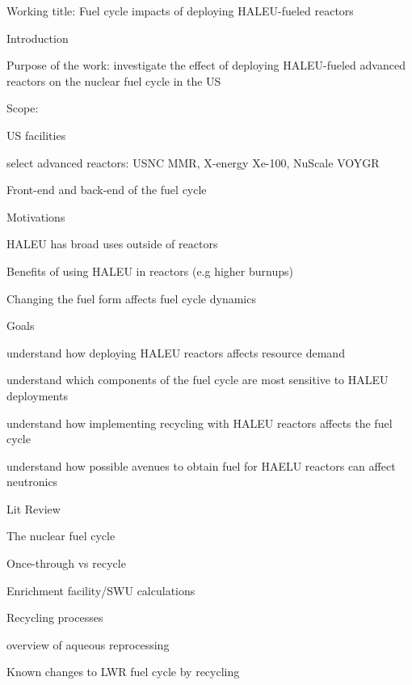 \documentclass{report}
\begin{document}
\noindent Working title: Fuel cycle impacts of deploying \gls{HALEU}-fueled reactors
\begin{outline}
\item Introduction
\begin{outline}
    \item Purpose of the work: investigate the effect of deploying HALEU-fueled 
          advanced reactors on the nuclear fuel cycle in the US 
    \item Scope:
    \begin{outline}
        \item US facilities
        \item select advanced reactors: USNC MMR, X-energy Xe-100, NuScale VOYGR
        \item Front-end and back-end of the fuel cycle
    \end{outline}
    \item Motivations
    \begin{outline}
        \item HALEU has broad uses outside of reactors \cite{nagley_ha-leu_2020}
        \item Benefits of using HALEU in reactors (e.g higher burnups)
        \item Changing the fuel form affects fuel cycle dynamics
    \end{outline}
    \item Goals
    \begin{outline}
        \item understand how deploying HALEU reactors affects resource demand
        \item understand which components of the fuel cycle are most sensitive to HALEU deployments
        \item understand how implementing recycling with HALEU reactors affects the fuel cycle
        \item understand how possible avenues to obtain fuel for HAELU reactors can affect neutronics
    \end{outline}
\end{outline}

\item Lit Review
\begin{outline}
    \item The nuclear fuel cycle
    \begin{outline}
          \item Once-through vs recycle \cite{tsoulfanidis_nuclear_2013}
          \item Enrichment facility/SWU calculations \cite{tsoulfanidis_nuclear_2013}
          \item Recycling processes \cite{tsoulfanidis_nuclear_2013}
          \begin{outline}
              \item overview of aqueous reprocessing 
              \item Known changes to LWR fuel cycle by recycling 
          \end{outline}
    \end{outline}
    

\end{outline}
\end{outline}
\end{document}
